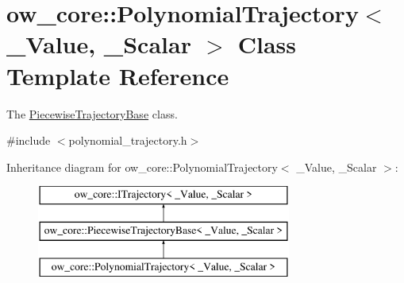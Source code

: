 \hypertarget{classow__core_1_1PolynomialTrajectory}{}\section{ow\+\_\+core\+:\+:Polynomial\+Trajectory$<$ \+\_\+\+Value, \+\_\+\+Scalar $>$ Class Template Reference}
\label{classow__core_1_1PolynomialTrajectory}


The \hyperlink{classow__core_1_1PiecewiseTrajectoryBase}{Piecewise\+Trajectory\+Base} class.  




{\ttfamily \#include $<$polynomial\+\_\+trajectory.\+h$>$}

Inheritance diagram for ow\+\_\+core\+:\+:Polynomial\+Trajectory$<$ \+\_\+\+Value, \+\_\+\+Scalar $>$\+:\begin{figure}[H]
\begin{center}
\leavevmode
\includegraphics[height=3.000000cm]{dd/d2e/classow__core_1_1PolynomialTrajectory}
\end{center}
\end{figure}
